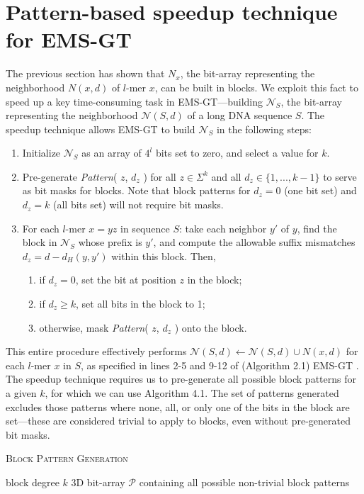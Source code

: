 \documentclass[oneside,12pt]{DISCSthesis}
\begin{document}
{	\section{Pattern-based speedup technique for EMS-GT}
		The previous section has shown that $N_x$, the bit-array representing the neighborhood $N(x,d)$ of $l$-mer $x$, can be built in blocks. We exploit this fact to speed up a key time-consuming task in EMS-GT---building $\mathcal{N}_S$, the bit-array representing the neighborhood $\mathcal{N}(S,d)$ of a long DNA sequence $S$. The speedup technique allows EMS-GT to build $\mathcal{N}_S$ in the following steps:
		\begin{enumerate}
			\item Initialize $\mathcal{N}_S$ as an array of $4^l$ bits set to zero, and select a value for $k$.
			\item Pre-generate {\em Pattern}( $z$, $d_z$ ) for all $z \in \Sigma^k$ and all $d_z \in \{1,...,k-1\}$ to serve as bit masks for blocks. Note that block patterns for $d_z=0$ (one bit set) and $d_z=k$ (all bits set) will not require bit masks.
			\item For each $l$-mer $x = yz$ in sequence $S$: take each neighbor $y'$ of $y$, find the block in $\mathcal{N}_S$ whose prefix is $y'$, and compute the allowable suffix mismatches $d_z = d - d_H(y,y')$ within this block. Then,
			\begin{enumerate}
				\item if $d_z = 0$, set the bit at position $z$ in the block;
				\item if $d_z \geq k$, set all bits in the block to 1;
				\item otherwise, mask {\em Pattern}( $z$, $d_z$ ) onto the block.
				\end{enumerate}
			\end{enumerate}
		\noindent This entire procedure effectively performs $\mathcal{N}(S,d) \leftarrow \mathcal{N}(S,d) \cup N(x,d)$ for each $l$-mer $x$ in $S$, as specified in lines 2-5 and 9-12 of (Algorithm 2.1) EMS-GT .
		\newpage
		\noindent The speedup technique requires us to pre-generate all possible block patterns for a given $k$, for which we can use Algorithm 4.1. The set of patterns generated  excludes those patterns where none, all, or only one of the bits in the block are set---these are considered trivial to apply to blocks, even without pre-generated bit masks. \\

			{ %
				\noindent \hspace*{6pt}{\bf Algorithm 4.1}
				\textsc{Block Pattern Generation}\small
				\begin{algorithmic}[1]\label{alg:block-pattern-gen}
					\Require block degree $k$
					\Ensure 3D bit-array $\mathcal{P}$ containing all possible non-trivial block patterns \vspace*{6pt}


\end{algorithmic}}}
\end{document}
